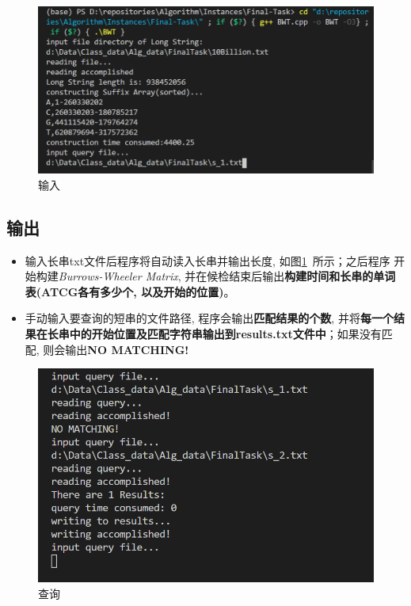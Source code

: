 \documentclass[UTF8]{ctexart}
\newcommand{\reff}[1]{图\ref{#1}\ }
\begin{document}
    \begin{figure}[H]
        \label{fig1}
        \centering
        \includegraphics[width=12cm]{../Resources/ft_input.png}
        \caption{输入}
    \end{figure}
    \subsection{输出}
    \begin{itemize}
        \item 输入长串txt文件后程序将自动读入长串并输出长度, 如\reff{fig1}所示；之后程序
        开始构建\emph{Burrows-Wheeler Matrix}, 并在候检结束后输出\textbf{构建时间和长串的单词表(ATCG各有多少个, 以及开始的位置)}。
        \item 手动输入要查询的短串的文件路径, 程序会输出\textbf{匹配结果的个数}, 并将\textbf{每一个结果在长串中的开始位置及匹配字符串输出到results.txt文件中}；如果没有匹配, 则会输出\textbf{NO MATCHING!}
    \end{itemize}
    \begin{figure}[H]
        \centering
        \label{fig2}
        \includegraphics[width=12cm]{resources/ft_output.png}
        \caption{查询}
    \end{figure}
\end{document}
